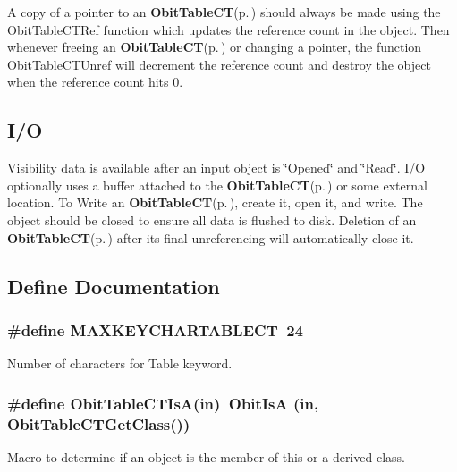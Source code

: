 A copy of a pointer to an {\bf Obit\-Table\-CT}{\rm (p.\,\pageref{structObitTableCT})} should always be made using the Obit\-Table\-CTRef function which updates the reference count in the object. Then whenever freeing an {\bf Obit\-Table\-CT}{\rm (p.\,\pageref{structObitTableCT})} or changing a pointer, the function Obit\-Table\-CTUnref will decrement the reference count and destroy the object when the reference count hits 0.\subsection{I/O}\label{ObitTableCT_8h_ObitTableCTUsage}
Visibility data is available after an input object is \char`\"{}Opened\char`\"{} and \char`\"{}Read\char`\"{}. I/O optionally uses a buffer attached to the {\bf Obit\-Table\-CT}{\rm (p.\,\pageref{structObitTableCT})} or some external location. To Write an {\bf Obit\-Table\-CT}{\rm (p.\,\pageref{structObitTableCT})}, create it, open it, and write. The object should be closed to ensure all data is flushed to disk. Deletion of an {\bf Obit\-Table\-CT}{\rm (p.\,\pageref{structObitTableCT})} after its final unreferencing will automatically close it.

\subsection{Define Documentation}
\subsubsection{\setlength{\rightskip}{0pt plus 5cm}\#define MAXKEYCHARTABLECT\ 24}\label{ObitTableCT_8h_a0}


Number of characters for Table keyword. 

\subsubsection{\setlength{\rightskip}{0pt plus 5cm}\#define Obit\-Table\-CTIs\-A(in)\ Obit\-Is\-A (in, Obit\-Table\-CTGet\-Class())}\label{ObitTableCT_8h_a3}


Macro to determine if an object is the member of this or a derived class. 


